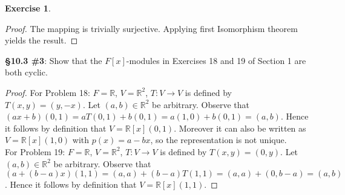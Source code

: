 \documentclass[8pt]{amsart}
\theoremstyle{plain}%
\theoremstyle{definition}
\newtheorem*{exercise}{Exercise}%
\theoremstyle{remark}
\numberwithin{equation}{section}
\newcommand{\R}{\mathbb{R}}
\begin{document}
\begin{exercise}
\begin{proof}
		The mapping is trivially surjective. Applying first Isomorphism theorem yields the result.
	\end{proof}


\textbf{\S 10.3 \#3}: Show that the $F[x]$-modules in Exercises 18 and 19 of Section 1 are both cyclic.
	\begin{proof}
		For Problem 18: $F = \R$, $V = \R^2$, $T : V \to V$ is defined by $T(x, y) = (y, -x)$. Let $(a, b) \in \R^2$ be arbitrary. Observe that $(ax + b)(0, 1) = aT(0, 1) + b(0, 1) = a(1, 0) + b(0, 1) = (a, b)$. Hence it follows by definition that $V = \R[x](0, 1)$. Moreover it can also be written as $V = \R[x](1, 0)$ with $p(x) = a - bx$, so the representation is not unique.\\

		For Problem 19: $F = \R$, $V = \R^2$, $T : V \to V$ is defined by $T(x, y) = (0, y)$. Let $(a, b) \in \R^2$ be arbitrary. Observe that $(a + (b - a)x)(1, 1) = (a, a) + (b - a)T(1, 1) = (a, a) + (0, b - a) = (a, b)$. Hence it follows by definition that $V = \R[x](1, 1)$.
	\end{proof}
\end{exercise}
\end{document}
